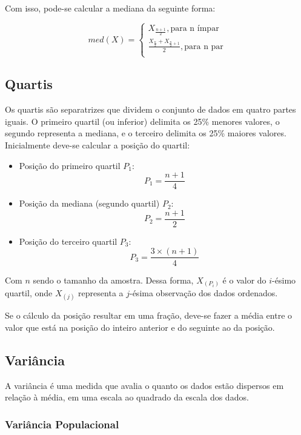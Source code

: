 \documentclass[
]{estat/estat}
\begin{document}
Com isso, pode-se calcular a mediana da seguinte forma:

\[
med(X) =
    \begin{cases}
         X_{\frac{n+1}{2}}, \textrm{para n ímpar} \\
         \frac{X_{\frac{n}{2}}+X_{\frac{n}{2} + 1}}{2}, \textrm{para n par} \\
    \end{cases}
\]

\subsection{Quartis}\label{quartis}

Os quartis são separatrizes que dividem o conjunto de dados em quatro
partes iguais. O primeiro quartil (ou inferior) delimita os 25\% menores
valores, o segundo representa a mediana, e o terceiro delimita os 25\%
maiores valores. Inicialmente deve-se calcular a posição do quartil:

\begin{itemize}
\item
  Posição do primeiro quartil \(P_1\): \[P_1=\frac{n+1}{4}\]
\item
  Posição da mediana (segundo quartil) \(P_2\): \[P_2 = \frac{n+1}{2}\]
\item
  Posição do terceiro quartil \(P_3\): \[P_3=\frac{3 \times (n+1)}{4}\]
\end{itemize}

Com \(n\) sendo o tamanho da amostra. Dessa forma,
\(X_{\left( P_i \right)}\) é o valor do \(i\)-ésimo quartil, onde
\(X_{\left( j \right)}\) representa a \(j\)-ésima observação dos dados
ordenados.

Se o cálculo da posição resultar em uma fração, deve-se fazer a média
entre o valor que está na posição do inteiro anterior e do seguinte ao
da posição.

\subsection{Variância}\label{variuxe2ncia}

A variância é uma medida que avalia o quanto os dados estão dispersos em
relação à média, em uma escala ao quadrado da escala dos dados.

\subsubsection{Variância Populacional}\label{variuxe2ncia-populacional}
\end{document}
